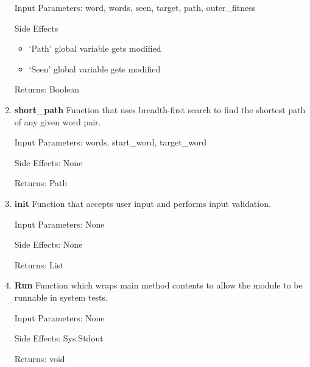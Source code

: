 \documentclass[12pt, a4]{report}
\begin{document}
\begin{enumerate}
			\par Input Parameters: word, words, seen, target, path, outer\_fitness
			\par Side Effects
			\begin{itemize}
				\item `Path' global variable gets modified 
				\item `Seen' global variable gets modified
			\end{itemize}
			\par Returns: Boolean
		\item
			\textbf{short\_path}
			\textbar{} Function that uses breadth-first search to find the shortest path of any given word pair. 
			\par Input Parameters: words, start\_word, target\_word 
			\par Side Effects: None
			\par Returns: Path 
		\item
			\textbf{init}
			\textbar{} Function that accepts user input and performs input validation.   
			\par Input Parameters: None  
			\par Side Effects: None
			\par Returns: List
		\item
		\textbf{Run}
		\textbar{} Function which wraps main method contents to allow the module to be runnable in system tests.
		\par Input Parameters: None  
		\par Side Effects: Sys.Stdout
		\par Returns: void
	

	
	\end{enumerate}
	
\end{document}
